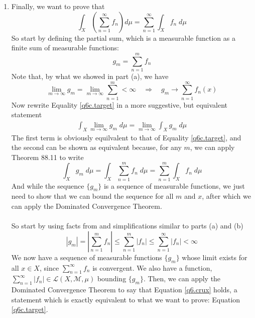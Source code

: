 \documentclass[12pt]{article}
\theoremstyle{plain}
\theoremstyle{definition}
\theoremstyle{remark}
\begin{document}
\begin{enumerate}
\begin{enumerate}
\item Finally, we want to prove that 
\begin{equation}
    \label{q6c.target}
    \int_X \left( \sum^\infty_{n=1} f_n\right) d\mu
    = \sum^\infty_{n=1} \int_X f_n \; d\mu
\end{equation}
So start by defining the partial sum, which is a measurable function as a finite sum of measurable functions:
\begin{equation}
    g_m = \sum^m_{n=1} f_n
\end{equation}
Note that, by what we showed in part (a), we have 
\begin{equation}
    \lim_{m\rightarrow\infty} g_m = 
    \lim_{m\rightarrow\infty} \sum^m_{n=1} <\infty
    \quad \Rightarrow\quad
    g_m\rightarrow \sum^\infty_{n=1} f_n(x)
\end{equation}
Now rewrite Equality \ref{q6c.target} in a more suggestive, but equivalent statement
\begin{align}
    \label{q6.crux}
    \int_X \lim_{m\rightarrow\infty} g_m \; d\mu =
    \lim_{m\rightarrow\infty} \int_X g_m \; d\mu
\end{align}
The first term is obviously equilvalent to that of Equality \ref{q6c.target}, and the second can be shown as equivalent because, for any $m$, we can apply Theorem 88.11 to write
\[
    \int_X g_m \; d\mu 
    = \int_X \sum^m_{n=1}f_n \; d\mu
    = \sum^m_{n=1}\int_X f_n \; d\mu
\]
And while the sequence $\{g_m\}$ is a sequence of measurable functions, we just need to show that we can bound the sequence for all $m$ and $x$, after which we can apply the Dominated Convergence Theorem.
\\
\\
So start by using facts from and simplifications similar to parts (a) and (b)
\[
    |g_m| =
    \left\lvert \sum^m_{n=1} f_n \right\rvert \leq 
    \sum^m_{n=1} \left\lvert f_n \right\rvert \leq 
    \sum^\infty_{n=1} \left\lvert f_n \right\rvert
    <\infty
\]
We now have a sequence of measurable functions $\{g_m\}$ whose limit exists for all $x\in X$, since $\sum^\infty_{n=1} f_n$ is convergent. We also have a function, $\sum^\infty_{n=1}|f_n|\in\mathscr{L}(X,\mathscr{M},\mu)$ bounding $\{g_m\}$. Then, we can apply the Dominated Convergence Theorem to say that Equation \ref{q6.crux} holds, a statement which is exactly equivalent to what we want to prove: Equation \ref{q6c.target}.





    



\end{enumerate}
\end{enumerate}
\end{document}
